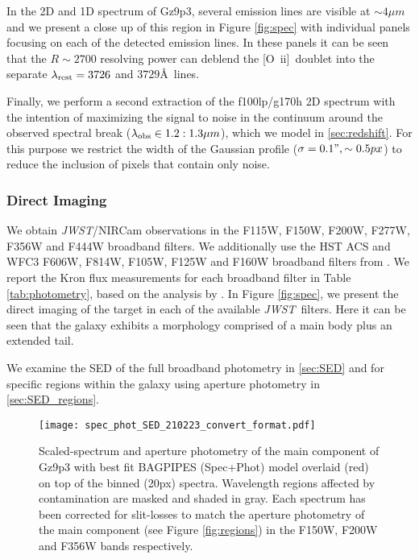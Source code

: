 \documentclass[sn-mathphys]{sn-jnl}%
\theoremstyle{thmstyleone}%
\theoremstyle{thmstyletwo}%
\theoremstyle{thmstylethree}%
\newcommand{\Oii}{[O~{\sc ii}]}
\newcommand{\jwst}{\textit{JWST}}
\begin{document}
In the 2D and 1D spectrum of Gz9p3, several emission lines are visible at $\sim4\mu m$ and we present a close up of this region in Figure \ref{fig:spec} with individual panels focusing on each of the detected emission lines. In these panels it can be seen that the $R\sim2700$ resolving power can deblend the \Oii\ doublet into the separate $\lambda_{\rm rest}=3726$ and $3729$\AA\ lines.

Finally, we perform a second extraction of the f100lp/g170h 2D spectrum with the intention of maximizing the signal to noise in the continuum around the observed spectral break ($\lambda_{\rm obs}\in1.2:1.3\mu m$), which we model in  \ref{sec:redshift}. For this purpose we restrict the width of the Gaussian profile ($\sigma=0.1", \sim0.5px$) to reduce the inclusion of pixels that contain only noise.

\subsubsection{Direct Imaging}
We obtain \jwst/NIRCam observations in the F115W, F150W, F200W, F277W, F356W and F444W broadband filters. We additionally use the HST ACS and WFC3 F606W, F814W, F105W, F125W and F160W broadband filters from \cite{Castellano2016}. We report the Kron flux measurements for each broadband filter in Table \ref{tab:photometry}, based on the analysis by  \cite{Paris23}. In Figure \ref{fig:spec}, we present the direct imaging of the target in each of the available \jwst\ filters. Here it can be seen that the galaxy exhibits a morphology comprised of a main body plus an extended tail. 

We examine the SED of the full broadband photometry in \ref{sec:SED} and for specific regions within the galaxy using aperture photometry in \ref{sec:SED_regions}.

\begin{figure*}
    \centering
    \texttt{[image: spec\_phot\_SED\_210223\_convert\_format.pdf]}
    \caption{Scaled-spectrum and aperture photometry of the main component of Gz9p3 with best fit BAGPIPES (Spec+Phot) model overlaid (red) on top of the binned (20px) spectra. Wavelength regions affected by contamination are masked and shaded in gray. Each spectrum has been corrected for slit-losses to match the aperture photometry of the main component (see Figure \ref{fig:regions}) in the F150W, F200W and F356W bands respectively. 
    }
    \label{fig:spec_phot}
\end{figure*}
\end{document}
